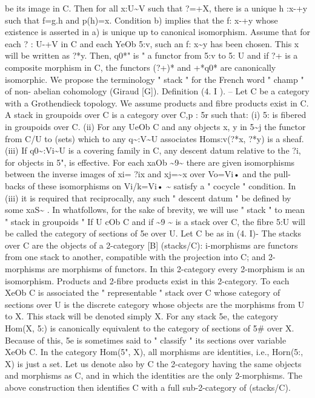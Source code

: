 \documentclass[11pt]{article}
\theoremstyle{plain}
\theoremstyle{definition}
\theoremstyle{remark}
\begin{document}
be its image in C. Then for all x:U\textasciitilde{}V such that ?=+X, there is a unique h :x-+y such that f=g.h and p(h)=x. Condition b) implies that the f: x-+y whose existence is asserted in a) is unique up to canonical isomorphism. Assume that for each ? : U-+V in C and each YeOb 5:v, such an f: x\textasciitilde{}y has been chosen. This x will be written as ?*y. Then, q0*" is " a functor from 5:v to 5: U and if ?+ is a composite morphism in C, the functors (?+)* and +*q0* are canonically isomorphic. We propose the terminology " stack " for the French word " champ " of non- abelian cohomology (Giraud [G]). Definition (4. I ). -- Let C be a category with a Grothendieck topology. We assume products and fibre products exist in C. A stack in groupoids over C is a category over C,p : 5r such that: (i) 5: is fibered in groupoids over C. (ii) For any UeOb C and any objects x, y in 5\textasciitilde{}j the functor from C/U to (sets) which to any q\textasciitilde{}:V\textasciitilde{}U associates Homs:v(?*x, ?*y) is a sheaf. (iii) If q0\textasciitilde{}:Vi\textasciitilde{}U is a covering family in C, any descent datum relative to the ?i, for objects in 5", is effective. For each xaOb \textasciitilde{}9\textasciitilde{} there are given isomorphisms between the inverse images of xi= ?ix and xj=\textasciitilde{}x over Vo=Vi• and the pull-backs of these isomorphisms on Vi/k=Vi• \textasciitilde{} satisfy a " cocycle " condition. In (iii) it is required that reciprocally, any such " descent datum " be defined by some xaS\textasciitilde{} . In whatfollows, for the sake of brevity, we will use " stack " to mean " stack in groupoids " If U cOb C and if \textasciitilde{}9 \textasciitilde{} is a stack over C, the fibre 5:U will be called the category of sections of 5e over U. Let C be as in (4. I)- The stacks over C are the objects of a 2-category [B] (stacks/C): i-morphisms are functors from one stack to another, compatible with the projection into C; and 2-morphisms are morphisms of functors. In this 2-category every 2-morphism is an isomorphism. Products and 2-fibre products exist in this 2-category. To each XeOb C is associated the " representable " stack over C whose category of sections over U is the discrete category whose objects are the morphisms from U to X. This stack will be denoted simply X. For any stack 5e, the category Hom(X, 5:) is canonically equivalent to the category of sections of 5\# over X. Because of this, 5e is sometimes said to " classify " its sections over variable XeOb C. In the category Hom(5", X), all morphisms are identities, i.e., Horn(5:, X) is just a set. Let us denote also by C the 2-category having the same objects and morphisms as C, and in which the identities are the only 2-morphisms. The above construction then identifies C with a full sub-2-category of (stacks/C).
\end{document}

